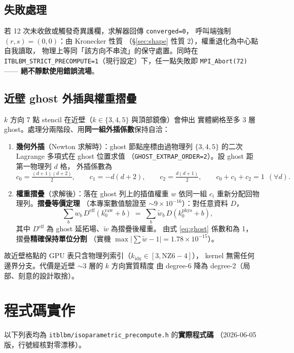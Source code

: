 \documentclass[11pt,a4paper]{article}
\newcommand{\code}[1]{\texttt{#1}}
\begin{document}
\subsection{失敗處理}
若 12 次未收斂或觸發奇異護欄，求解器回傳 \code{converged=0}，
呼叫端強制 $(r,s)=(0,0)$：由 Kronecker 性質
（\S\ref{sec:shape} 性質 2），權重退化為中心點自我讀取，
物理上等同「該方向不串流」的保守處置。同時在
\code{ITBLBM\_STRICT\_PRECOMPUTE=1}（現行設定）下，任一點失敗即
\code{MPI\_Abort(72)} —— \textbf{絕不靜默使用錯誤流場}。

\subsection{近壁 ghost 外插與權重摺疊}
\label{sec:fold}
$k$ 方向 7 點 stencil 在近壁（$k\in\{3,4,5\}$ 與頂部鏡像）會伸出
實體網格至多 3 層 ghost。處理分兩階段、用\textbf{同一組外插係數}保持自洽：
\begin{enumerate}[itemsep=1pt]
\item \textbf{幾何外插}（Newton 求解時）：ghost 節點座標由過物理列
      $\{3,4,5\}$ 的二次 Lagrange 多項式在 ghost 位置求值
      （\code{GHOST\_EXTRAP\_ORDER=2}）。設 ghost 距第一物理列 $d$ 格，
      外插係數為
\begin{equation}
c_0=\tfrac{(d{+}1)(d{+}2)}{2},\qquad c_1=-d(d{+}2),\qquad c_2=\tfrac{d(d{+}1)}{2},
\qquad c_0+c_1+c_2=1\ \ (\forall d).
\label{eq:ghost}
\end{equation}
\item \textbf{權重摺疊}（求解後）：落在 ghost 列上的插值權重 $w$
      依同一組 $c_i$ 重新分配回物理列。\textbf{摺疊等價定理}
      （本專案數值驗證至 $\sim 9\times10^{-16}$）：對任意資料 $D$，
\begin{equation}
\sum_{b}w_b\,D^{\mathrm{eff}}(k_0^{\mathrm{raw}}+b)
\;=\;
\sum_{b}\tilde w_b\,D(k_0^{\mathrm{phys}}+b),
\label{eq:foldthm}
\end{equation}
其中 $D^{\mathrm{eff}}$ 為 ghost 延拓場、$\tilde w$ 為摺疊後權重。
由式 \eqref{eq:ghost} 係數和為 1，摺疊\textbf{精確保持單位分割}
（實機 $\max\bigl|\sum\tilde w-1\bigr|=1.78\times10^{-15}$）。
\end{enumerate}
故近壁格點的 GPU 表只含物理列索引（$k_{\mathrm{idx}}\in[3,\mathrm{NZ6}-4]$），
kernel 無需任何邊界分支。代價是近壁 $\sim$3 層的 $k$ 方向實質精度
由 degree-6 降為 degree-2（局部、刻意的設計取捨）。

\section{程式碼實作}
\label{sec:code}
以下列表均為 \code{itblbm/isoparametric\_precompute.h} 的\textbf{實際程式碼}
（2026-06-05 版，行號經核對零漂移）。
\end{document}

